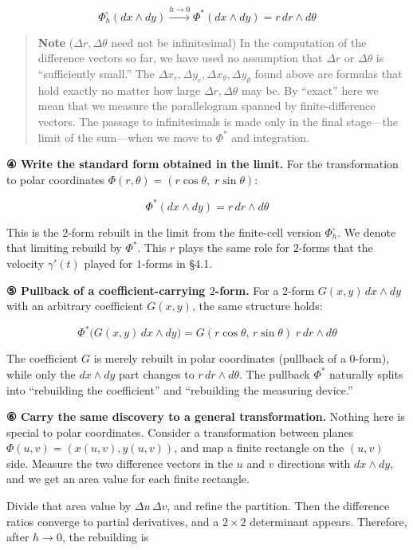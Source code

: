 \[
\Phi_h^\square(dx\wedge dy)
\xrightarrow{h\to0}
\Phi^*(dx\wedge dy)
=
r\,dr\wedge d\theta
\]

\begin{quote}
\textbf{Note} (\(\Delta r,\Delta\theta\) need not be infinitesimal) In
the computation of the difference vectors so far, we have used no
assumption that \(\Delta r\) or \(\Delta\theta\) is ``sufficiently
small.'' The
\(\Delta x_r, \Delta y_r, \Delta x_\theta, \Delta y_\theta\) found above
are formulas that hold exactly no matter how large
\(\Delta r,\Delta\theta\) may be. By ``exact'' here we mean that we
measure the parallelogram spanned by finite-difference vectors. The
passage to infinitesimals is made only in the final stage---the limit of
the sum---when we move to \(\Phi^*\) and integration.
\end{quote}

\textbf{④ Write the standard form obtained in the limit.} For the
transformation to polar coordinates
\(\Phi(r,\theta) = (r\cos\theta,\; r\sin\theta)\):

\[\Phi^*(dx \wedge dy) = r\,dr \wedge d\theta\]

This is the \(2\)-form rebuilt in the limit from the finite-cell version
\(\Phi_h^\square\). We denote that limiting rebuild by \(\Phi^*\). This
\(r\) plays the same role for \(2\)-forms that the velocity
\(\gamma'(t)\) played for \(1\)-forms in §4.1.

\textbf{⑤ Pullback of a coefficient-carrying $2$-form.} For a \(2\)-form
\(G(x,y)\,dx \wedge dy\) with an arbitrary coefficient \(G(x,y)\), the
same structure holds:

\[\Phi^*\bigl(G(x,y)\,dx \wedge dy\bigr) = G(r\cos\theta,\, r\sin\theta)\; r\,dr \wedge d\theta\]

The coefficient \(G\) is merely rebuilt in polar coordinates (pullback
of a \(0\)-form), while only the \(dx \wedge dy\) part changes to
\(r\,dr \wedge d\theta\). The pullback \(\Phi^*\) naturally splits into
``rebuilding the coefficient'' and ``rebuilding the measuring device.''

\textbf{⑥ Carry the same discovery to a general transformation.} Nothing
here is special to polar coordinates. Consider a transformation between
planes \(\Phi(u,v)=(x(u,v),y(u,v))\), and map a finite rectangle on the
\((u,v)\) side. Measure the two difference vectors in the \(u\) and
\(v\) directions with \(dx\wedge dy\), and we get an area value for each
finite rectangle.

Divide that area value by \(\Delta u\,\Delta v\), and refine the
partition. Then the difference ratios converge to partial derivatives,
and a \(2\times2\) determinant appears. Therefore, after \(h\to0\), the
rebuilding is

